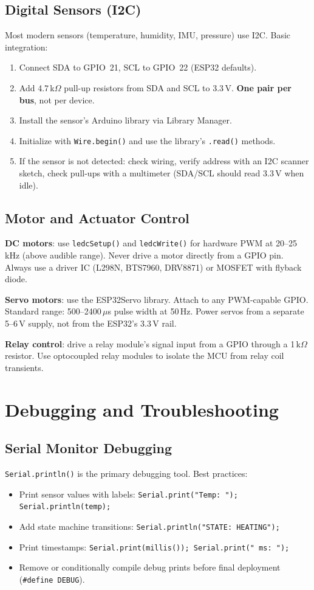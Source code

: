 \subsection{Digital Sensors (I2C)}
Most modern sensors (temperature, humidity, IMU, pressure) use I2C. Basic integration:
\begin{enumerate}[nosep,leftmargin=1.5em]
\item Connect SDA to GPIO~21, SCL to GPIO~22 (ESP32 defaults).
\item Add 4.7\,k$\Omega$ pull-up resistors from SDA and SCL to 3.3\,V. \textbf{One pair per bus}, not per device.
\item Install the sensor's Arduino library via Library Manager.
\item Initialize with \texttt{Wire.begin()} and use the library's \texttt{.read()} methods.
\item If the sensor is not detected: check wiring, verify address with an I2C scanner sketch, check pull-ups with a multimeter (SDA/SCL should read 3.3\,V when idle).
\end{enumerate}

\subsection{Motor and Actuator Control}
\textbf{DC motors}: use \texttt{ledcSetup()} and \texttt{ledcWrite()} for hardware PWM at 20--25\,kHz (above audible range). Never drive a motor directly from a GPIO pin. Always use a driver IC (L298N, BTS7960, DRV8871) or MOSFET with flyback diode.

\textbf{Servo motors}: use the ESP32Servo library. Attach to any PWM-capable GPIO. Standard range: 500--2400\,$\mu$s pulse width at 50\,Hz. Power servos from a separate 5--6\,V supply, not from the ESP32's 3.3\,V rail.

\textbf{Relay control}: drive a relay module's signal input from a GPIO through a 1\,k$\Omega$ resistor. Use optocoupled relay modules to isolate the MCU from relay coil transients.

\section{Debugging and Troubleshooting}

\subsection{Serial Monitor Debugging}
\texttt{Serial.println()} is the primary debugging tool. Best practices:
\begin{itemize}[nosep,leftmargin=1.5em]
\item Print sensor values with labels: \texttt{Serial.print("Temp: "); Serial.println(temp);}
\item Add state machine transitions: \texttt{Serial.println("STATE: HEATING");}
\item Print timestamps: \texttt{Serial.print(millis()); Serial.print(" ms: ");}
\item Remove or conditionally compile debug prints before final deployment (\texttt{\#define DEBUG}).
\end{itemize}

